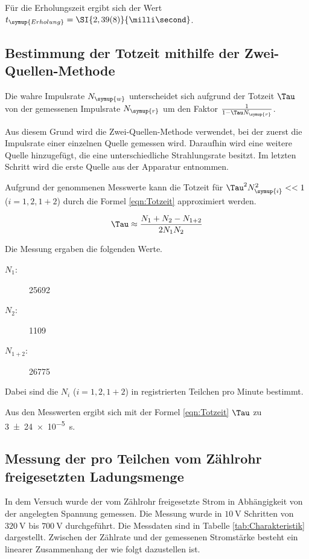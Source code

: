 Für die Erholungszeit ergibt sich der Wert $t_{\symup{Erholung}} = \SI{2,39(8)}{\milli\second}$.

\subsection{Bestimmung der Totzeit mithilfe der Zwei-Quellen-Methode}

Die wahre Impulsrate $N_{\symup{w}}$ unterscheidet sich aufgrund der Totzeit $\Tau$ von der
gemessenen Impulsrate $N_{\symup{r}}$ um den Faktor $\frac{1}{1-\Tau N_{\symup{r}}}$.

Aus diesem Grund wird die Zwei-Quellen-Methode verwendet, bei der
zuerst die Impulsrate einer einzelnen Quelle gemessen wird.
Daraufhin wird eine weitere Quelle hinzugefügt, die eine unterschiedliche
Strahlungsrate besitzt. Im letzten Schritt wird die erste Quelle aus der
Apparatur entnommen.

Aufgrund der genommenen Messwerte kann die Totzeit für $\Tau^2N_{\symup{i}}^2 << 1$
($i = 1, 2, 1+2$) durch die Formel \eqref{eqn:Totzeit} approximiert werden.

\begin{equation}
  \label{eqn:Totzeit}
  \Tau \approx \frac{N_1 + N_2 - N_{1+2}}{2N_1N_2}
\end{equation}

Die Messung ergaben die folgenden Werte.

\begin{description}
  \item[$N_1:$] 25692
  \item[$N_2:$] 1109
  \item[$N_{1+2}:$] 26775
\end{description}

Dabei sind die $N_i$ ($i = 1, 2, 1+2$) in registrierten Teilchen pro Minute bestimmt.

Aus den Messwerten ergibt sich mit der Formel \eqref{eqn:Totzeit}
$\Tau$ zu \SI{3(24)e-5}{\second}.

\subsection{Messung der pro Teilchen vom Zählrohr freigesetzten Ladungsmenge}

In dem Versuch wurde der vom Zählrohr freigesetzte Strom
in Abhängigkeit von der angelegten Spannung gemessen.
Die Messung wurde in $\SI{10}{\volt}$ Schritten von
$\SI{320}{\volt}$ bis $\SI{700}{\volt}$ durchgeführt.
Die Messdaten sind in Tabelle \ref{tab:Charakteristik} dargestellt.
Zwischen der Zählrate und der gemessenen Stromstärke besteht ein
linearer Zusammenhang der wie folgt dazustellen ist.

